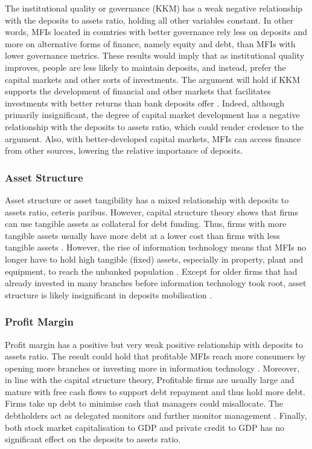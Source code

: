 \documentclass[a4paper, nobind]{templates/ociamthesis}
\begin{document}
The institutional quality or governance (KKM) has a weak negative relationship with the deposits to assets ratio, holding all other variables constant. In other words, MFIs located in countries with better governance rely less on deposits and more on alternative forms of finance, namely equity and debt, than MFIs with lower governance metrics. These results would imply that as institutional quality improves, people are less likely to maintain deposits, and instead, prefer the capital markets and other sorts of investments. The argument will hold if KKM supports the development of financial and other markets that facilitates investments with better returns than bank deposits offer \autocite{la2013law,schnyder2018twenty}. Indeed, although primarily insignificant, the degree of capital market development has a negative relationship with the deposits to assets ratio, which could render credence to the argument. Also, with better-developed capital markets, MFIs can access finance from other sources, lowering the relative importance of deposits.

\hypertarget{asset-structure}{%
\subsubsection{Asset Structure}\label{asset-structure}}

Asset structure or asset tangibility has a mixed relationship with deposits to assets ratio, ceteris paribus. However, capital structure theory shows that firms can use tangible assets as collateral for debt funding. Thus, firms with more tangible assets usually have more debt at a lower cost than firms with less tangible assets \autocite{campello2011capital,ombati2016effects}. However, the rise of information technology means that MFIs no longer have to hold high tangible (fixed) assets, especially in property, plant and equipment, to reach the unbanked population \autocite{asadullah2021access}. Except for older firms that had already invested in many branches before information technology took root, asset structure is likely insignificant in deposits mobilisation \autocite{di2021technology}.

\hypertarget{profit-margin}{%
\subsubsection{Profit Margin}\label{profit-margin}}

Profit margin has a positive but very weak positive relationship with deposits to assets ratio. The result could hold that profitable MFIs reach more consumers by opening more branches or investing more in information technology \autocite{di2021technology}. Moreover, in line with the capital structure theory, Profitable firms are usually large and mature with free cash flows to support debt repayment and thus hold more debt. Firms take up debt to minimise cash that managers could misallocate. The debtholders act as delegated monitors and further monitor management \autocite{barclay2005capital,gwatidzo2009corporate,ombati2016effects}. Finally, both stock market capitalisation to GDP and private credit to GDP has no significant effect on the deposits to assets ratio.
\end{document}

